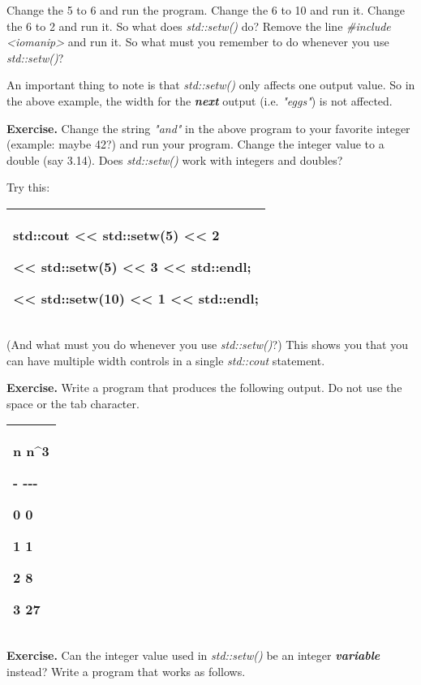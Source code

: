 \documentclass[
]{article}
\begin{document}
Change the 5 to 6 and run the program. Change the 6 to 10 and run it.
Change the 6 to 2 and run it. So what does \emph{std::setw()} do? Remove
the line \emph{\#include \textless iomanip\textgreater{}} and run it. So
what must you remember to do whenever you use \emph{std::setw()}?

An important thing to note is that \emph{std::setw()} only affects one
output value. So in the above example, the width for the
\emph{\textbf{next}} output (i.e. \emph{"eggs"}) is not affected.

\textbf{Exercise.} Change the string \emph{"and"} in the above program
to your favorite integer (example: maybe 42?) and run your program.
Change the integer value to a double (say 3.14). Does \emph{std::setw()}
work with integers and doubles?

Try this:

\begin{longtable}[]{@{}l@{}}
\toprule
\endhead
\begin{minipage}[t]{0.97\columnwidth}\raggedright
std::cout \textless\textless{} std::setw(5) \textless\textless{} 2

\textless\textless{} std::setw(5) \textless\textless{} 3
\textless\textless{} std::endl;

\textless\textless{} std::setw(10) \textless\textless{} 1
\textless\textless{} std::endl;\strut
\end{minipage}\tabularnewline
\bottomrule
\end{longtable}

(And what must you do whenever you use \emph{std::setw()}?) This shows
you that you can have multiple width controls in a single
\emph{std::cout} statement.

\textbf{Exercise.} Write a program that produces the following output.
Do not use the space or the tab character.

\begin{longtable}[]{@{}l@{}}
\toprule
\endhead
\begin{minipage}[t]{0.97\columnwidth}\raggedright
n n\^{}3

- -\/-\/-

0 0

1 1

2 8

3 27\strut
\end{minipage}\tabularnewline
\bottomrule
\end{longtable}

\textbf{Exercise.} Can the integer value used in \emph{std::setw()} be
an integer \emph{\textbf{variable}} instead? Write a program that works
as follows.
\end{document}
